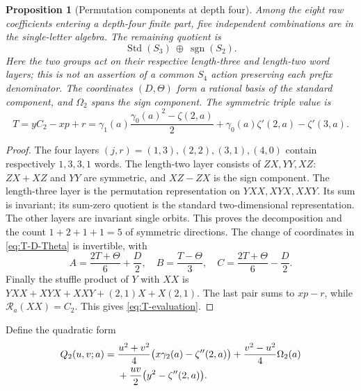 \documentclass[11pt]{article}
\numberwithin{equation}{section}
\newtheorem{proposition}[theorem]{Proposition}
\theoremstyle{definition}
\newcommand{\R}{\mathcal R}
\begin{document}
\begin{proposition}[Permutation components at depth four]
\label{prop:quartic-components}
Among the eight raw coefficients entering a depth-four finite part,
five independent combinations are in the single-letter algebra.
The remaining quotient is
\begin{equation}\label{eq:quartic-representation}
 \operatorname{Std}(S_3)\ \oplus\ \operatorname{sgn}(S_2).
\end{equation}
Here the two groups act on their respective length-three and length-two
word layers; this is not an assertion of a common $S_4$ action preserving
each prefix denominator. The coordinates $(D,\Theta)$ form a rational
basis of the standard component, and $\Omega_2$ spans the sign component.
The symmetric triple value is
\begin{equation}\label{eq:T-evaluation}
 T=yC_2-xp+r
   =\gamma_1(a)\frac{\gamma_0(a)^2-\zeta(2,a)}2
        +\gamma_0(a)\zeta'(2,a)-\zeta'(3,a).
\end{equation}
\end{proposition}
\begin{proof}
The four layers $(j,r)=(1,3),(2,2),(3,1),(4,0)$ contain respectively
$1,3,3,1$ words. The length-two layer consists of $ZX,YY,XZ$:
$ZX+XZ$ and $YY$ are symmetric, and $XZ-ZX$ is the sign component.
The length-three layer is the permutation representation on $YXX,XYX,XXY$.
Its sum is invariant; its sum-zero quotient is the standard two-dimensional
representation. The other layers are invariant single orbits. This proves
the decomposition and the count $1+2+1+1=5$ of symmetric directions.
The change of coordinates in \eqref{eq:T-D-Theta} is invertible, with
\begin{equation}\label{eq:ABC-inverse}
 A=\frac{2T+\Theta}{6}+\frac D2,\quad
 B=\frac{T-\Theta}{3},\quad
 C=\frac{2T+\Theta}{6}-\frac D2.
\end{equation}
Finally the stuffle product of $Y$ with $XX$ is
$YXX+XYX+XXY+(2,1)X+X(2,1)$. The last pair sums to $xp-r$,
while $\R_a(XX)=C_2$. This gives \eqref{eq:T-evaluation}.
\end{proof}

Define the quadratic form
\begin{align}\label{eq:quadratic-Q}
 Q_2(u,v;a)={}&\frac{u^2+v^2}{4}
                 \bigl(x\gamma_2(a)-\zeta''(2,a)\bigr)
             +\frac{v^2-u^2}{4}\Omega_2(a)\notag\\
 &+\frac{uv}{2}\bigl(y^2-\zeta''(2,a)\bigr).
\end{align}
\end{document}
